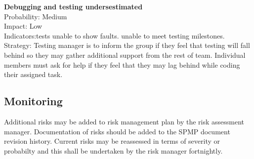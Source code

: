 			\textbf{Debugging and testing undersestimated}\\
			Probability: Medium\\
			Impact: Low\\
			Indicators:tests unable to show faults. unable to meet testing milestones.\\
			Strategy: Testing manager is to inform the group if they feel that testing will fall behind so they may gather additional support from the rest of team. Individual members must ask for help if they feel that they may lag behind while coding their assigned task.\\


		
		\subsection{Monitoring}
		Additional risks may be added to risk management plan by the risk assessment manager. Documentation of risks should be added to the SPMP document revision history.
		Current risks may be reassessed in terms of severity or probabilty and this shall be undertaken by the risk manager fortnightly.
